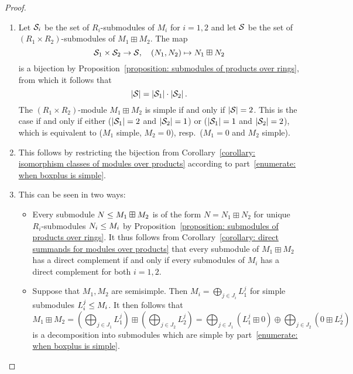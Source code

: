 \begin{proof}
  \leavevmode
  \begin{enumerate}
    \item
      Let $\mathcal{S}_i$ be the set of $R_i$-submodules of $M_i$ for $i = 1, 2$ and let $\mathcal{S}$ be the set of $(R_1 \times R_2)$-submodules of $M_1 \boxplus M_2$.
      The map
      \[
                  \mathcal{S}_1 \times \mathcal{S}_2
        \to      \mathcal{S},
        \quad    (N_1, N_2)
        \mapsto  N_1 \boxplus N_2
      \]
      is a bijection by Proposition~\ref{proposition: submodules of products over rings}, from which it follows that
      \[
        |\mathcal{S}| = |\mathcal{S}_1| \cdot |\mathcal{S}_2| \,.
      \]
      The $(R_1 \times R_2)$-module $M_1 \boxplus M_2$ is simple if and only if $|\mathcal{S}| = 2$.
      This is the case if and only if either ($|\mathcal{S}_1| = 2$ and $|\mathcal{S}_2| = 1$) or ($|\mathcal{S}_1| = 1$ and $|\mathcal{S}_2| = 2$), which is equivalent to ($M_1$ simple, $M_2 = 0$), resp.\ ($M_1 = 0$ and $M_2$ simple).
    \item
      This follows by restricting the bijection from Corollary~\ref{corollary: isomorphism classes of modules over products} according to part~\ref*{enumerate: when boxplus is simple}.
        \item
      This can be seen in two ways:
      
      \begin{itemize}
        \item
          Every submodule $N \leq M_1 \boxplus M_2$ is of the form $N = N_1 \boxplus N_2$ for unique $R_i$-submodules $N_i \leq M_i$ by Proposition~\ref{proposition: submodules of products over rings}.
          It thus follows from Corollary~\ref{corollary: direct summands for modules over products} that every submodule of $M_1 \boxplus M_2$ has a direct complement if and only if every submodules of $M_i$ has a direct complement for both $i = 1, 2$.
        \item
          Suppose that $M_1, M_2$ are semisimple.
          Then $M_i = \bigoplus_{j \in J_i} L^j_1$ for simple submodules $L^j_i \leq M_i$.
          It then follows that
          \[
              M_1 \boxplus M_2
            = \left( \bigoplus_{j \in J_1} L^j_1 \right)
              \boxplus
              \left( \bigoplus_{j \in J_2} L^j_2 \right)
            = \bigoplus_{j \in J_1} (L^j_1 \boxplus 0)
              \oplus
              \bigoplus_{j \in J_2} (0 \boxplus L^j_2)
          \]
          is a decomposition into submodules which are simple by part~\ref*{enumerate: when boxplus is simple}.
          

\end{itemize}
\end{enumerate}
\end{proof}
